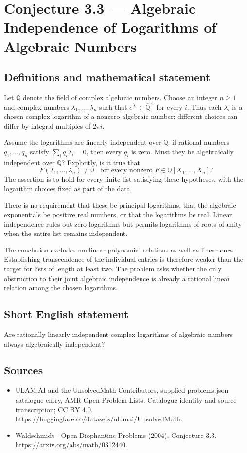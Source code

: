 \documentclass[11pt,a4paper]{article}
\begin{document}
\section*{Conjecture 3.3 — Algebraic Independence of Logarithms of Algebraic Numbers}\label{statement}

\subsection{Definitions and mathematical statement}
Let $\overline{\mathbb Q}$ denote the field of complex algebraic numbers. Choose an integer $n\ge1$ and complex numbers $\lambda_1,\ldots,\lambda_n$ such that $e^{\lambda_i}\in\overline{\mathbb Q}^{\times}$ for every $i$. Thus each $\lambda_i$ is a chosen complex logarithm of a nonzero algebraic number; different choices can differ by integral multiples of $2\pi i$.

Assume the logarithms are linearly independent over $\mathbb Q$: if rational numbers $q_1,\ldots,q_n$ satisfy $\sum_i q_i\lambda_i=0$, then every $q_i$ is zero. Must they be algebraically independent over $\mathbb Q$? Explicitly, is it true that
\[
F(\lambda_1,\ldots,\lambda_n)\ne0
\quad\text{for every nonzero }F\in\mathbb Q[X_1,\ldots,X_n]?
\]
The assertion is to hold for every finite list satisfying these hypotheses, with the logarithm choices fixed as part of the data.

There is no requirement that these be principal logarithms, that the algebraic exponentials be positive real numbers, or that the logarithms be real. Linear independence rules out zero logarithms but permits logarithms of roots of unity when the entire list remains independent.

The conclusion excludes nonlinear polynomial relations as well as linear ones. Establishing transcendence of the individual entries is therefore weaker than the target for lists of length at least two. The problem asks whether the only obstruction to their joint algebraic independence is already a rational linear relation among the chosen logarithms.
\subsection{Short English statement}
Are rationally linearly independent complex logarithms of algebraic numbers always algebraically independent?
\subsection{Sources}
\begin{itemize}
\item[S1] ULAM.AI and the UnsolvedMath Contributors, supplied problems.json, catalogue entry, AMR Open Problem Lists. Catalogue identity and source transcription; CC BY 4.0.
\url{https://huggingface.co/datasets/ulamai/UnsolvedMath}.
\item[S2] Waldschmidt - Open Diophantine Problems (2004), Conjecture 3.3. 
\url{https://arxiv.org/abs/math/0312440}.
\end{itemize}
\end{document}
